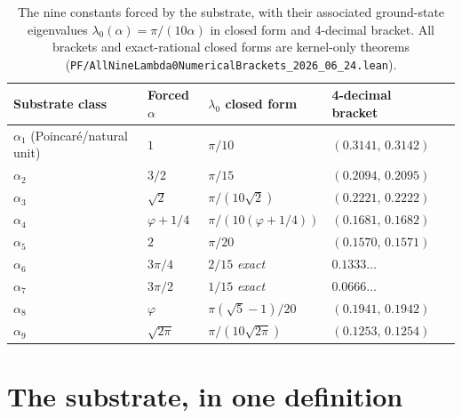 \documentclass[11pt,a4paper]{amsart}
\theoremstyle{plain}
\theoremstyle{definition}
\begin{document}
\begin{table}[h]
\centering
\caption{The nine constants forced by the substrate, with their associated ground-state eigenvalues $\lambda_0(\alpha) = \pi/(10\alpha)$ in closed form and 4-decimal bracket. All brackets and exact-rational closed forms are kernel-only theorems (\texttt{PF/AllNineLambda0NumericalBrackets\_2026\_06\_24.lean}).}\label{tab:nine}
\begin{tabular}{lllll}
\toprule
Substrate class & Forced $\alpha$ & $\lambda_0$ closed form & 4-decimal bracket \\
\midrule
$\alpha_1$ (Poincar\'e/natural unit) & $1$            & $\pi/10$                 & $(0.3141,\,0.3142)$ \\
$\alpha_2$                            & $3/2$          & $\pi/15$                 & $(0.2094,\,0.2095)$ \\
$\alpha_3$                            & $\sqrt{2}$     & $\pi/(10\sqrt{2})$       & $(0.2221,\,0.2222)$ \\
$\alpha_4$                            & $\varphi+1/4$  & $\pi/(10(\varphi+1/4))$  & $(0.1681,\,0.1682)$ \\
$\alpha_5$                            & $2$            & $\pi/20$                 & $(0.1570,\,0.1571)$ \\
$\alpha_6$                            & $3\pi/4$       & $2/15$ \textit{exact}    & $0.1333\ldots$       \\
$\alpha_7$                            & $3\pi/2$       & $1/15$ \textit{exact}    & $0.0666\ldots$       \\
$\alpha_8$                            & $\varphi$      & $\pi(\sqrt{5}-1)/20$     & $(0.1941,\,0.1942)$ \\
$\alpha_9$                            & $\sqrt{2\pi}$  & $\pi/(10\sqrt{2\pi})$    & $(0.1253,\,0.1254)$ \\
\bottomrule
\end{tabular}
\end{table}

\section{The substrate, in one definition}\label{sec:substrate}
\end{document}
